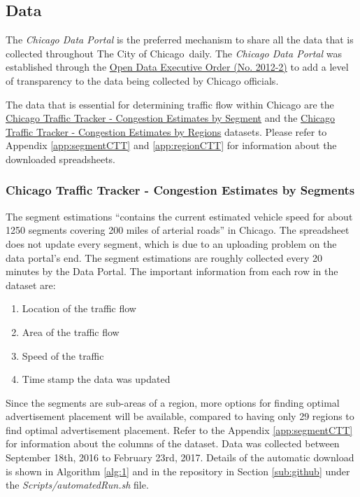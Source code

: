 \documentclass[titlepage,twocolumn]{article}
\newcommand{\CityChicago}{City of Chicago}
\begin{document}
\subsection{Data}
\label{sub:Data}

\par The \textit{Chicago Data Portal} \cite{dataPortal} is the preferred mechanism to share all the data that is collected throughout The \CityChicago\ daily. The \textit{Chicago Data Portal} was established through the \href{https://www.cityofchicago.org/city/en/narr/foia/open_data_executiveorder.html}{Open Data Executive Order (No. 2012-2)} to add a level of transparency to the data being collected by Chicago officials. 

\par The data that is essential for determining traffic flow within Chicago are the
\href{https://data.cityofchicago.org/Transportation/Chicago-Traffic-Tracker-Congestion-Estimates-by-Se/n4j6-wkkf}{Chicago Traffic Tracker - Congestion Estimates by Segment} and the  \href{https://data.cityofchicago.org/Transportation/Chicago-Traffic-Tracker-Congestion-Estimates-by-Re/t2qc-9pjd}{Chicago Traffic Tracker - Congestion Estimates by Regions} datasets. Please refer to Appendix \ref{app:segmentCTT} and \ref{app:regionCTT} for information about the downloaded spreadsheets.

\subsubsection{Chicago Traffic Tracker - Congestion Estimates by Segments}

\par The segment estimations “contains the current estimated vehicle speed for about 1250 segments covering 200 miles of arterial roads” \cite{S1} in Chicago. The spreadsheet does not update every segment, which is due to an uploading problem on the data portal's end. The segment estimations are roughly collected every 20 minutes by the Data Portal. The important information from each row in the dataset are:
\begin{enumerate}
	\item Location of the traffic flow
	\item Area of the traffic flow
	\item Speed of the traffic
	\item Time stamp the data was updated
\end{enumerate}

\par Since the segments are sub-areas of a region, more options for finding optimal advertisement placement will be available, compared to having only 29 regions to find optimal advertisement placement. Refer to the Appendix \ref{app:segmentCTT} for information about the columns of the dataset. Data was collected between September 18th, 2016 to February 23rd, 2017. Details of the automatic download is shown in Algorithm \ref{alg:1} and in the repository in Section \ref{sub:github} under the \textit{Scripts/automatedRun.sh} file.
\end{document}
